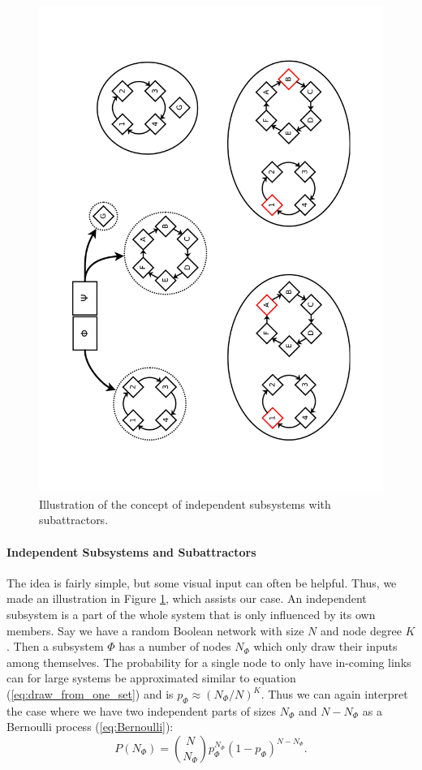\paragraph*{}
\begin{figure}[]
	\includegraphics[height=\textwidth,angle=-90]{Plots/subattractors2}
	\caption{Illustration of the concept of independent subsystems with subattractors.}
	\label{fig:subattractors}
\end{figure}

\paragraph*{Independent Subsystems and Subattractors}
The idea is fairly simple, but some visual input can often be helpful. Thus, we made an illustration in Figure \ref{fig:subattractors}, which assists our case. An independent subsystem is a part of the whole system that is only influenced by its own members. Say we have a random Boolean network with size $N$ and node degree $K$. Then a subsystem $\Phi$ has a number of nodes $N_{\Phi}$ which only draw their inputs among themselves. The probability for a single node to only have in-coming links can for large systems be approximated similar to equation (\ref{eq:draw_from_one_set}) and is $p_{\Phi} \approx (N_{\Phi}/N)^K $. Thus we can again interpret the case where we have two independent parts of sizes $N_{\Phi}$ and $N-N_{\Phi}$ as a Bernoulli process (\ref{eq:Bernoulli}):
\begin{equation}
P(N_{\Phi}) = {N \choose N_{\Phi}} p_{\Phi}^{N_{\Phi}}(1-p_{\Phi})^{N-N_{\Phi}}.
\end{equation}

